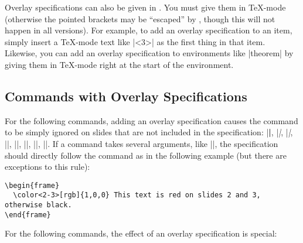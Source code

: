 \lyxnote
Overlay specifications can also be given in \LyX. You must give them in \TeX-mode (otherwise the pointed brackets may be ``escaped'' by \LyX, though this will not happen in all versions). For example, to add an overlay specification to an item, simply insert a \TeX-mode text like |<3>| as the first thing in that item. Likewise, you can add an overlay specification to environments like |theorem| by giving them in \TeX-mode right at the start of the environment.


\subsection{Commands with Overlay Specifications}
\label{section-overlay-commands}

For the following commands, adding an overlay specification causes the command to be simply ignored on slides that are not included in the specification: |\textbf|, |\textit|, |\textsl|, |\textrm|, |\textsf|, |\color|, |\alert|, |\structure|. If a command takes several arguments, like |\color|, the specification should directly follow the command as in the following example (but there are exceptions to this rule):
\begin{verbatim}
\begin{frame}
  \color<2-3>[rgb]{1,0,0} This text is red on slides 2 and 3, otherwise black.
\end{frame}
\end{verbatim}

For the following commands, the effect of an overlay specification is special:

